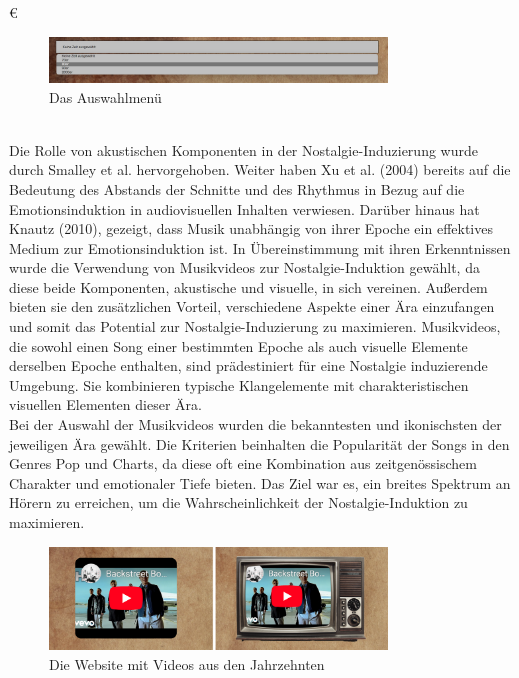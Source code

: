 €\documentclass[./dokumentation.tex]{subfiles}
\begin{document}
\begin{figure}[H]
    \centering
    \includegraphics[width=0.8\textwidth]{bilder/dropdown-scott.png}
    \caption{Das Auswahlmenü}
    \label{fig23:auswahl}
\end{figure}\\


Die Rolle von akustischen Komponenten in der Nostalgie-Induzierung wurde durch Smalley et al. hervorgehoben. Weiter haben Xu et al. (2004) bereits auf die Bedeutung des Abstands der Schnitte und des Rhythmus in Bezug auf die Emotionsinduktion in audiovisuellen Inhalten verwiesen. Darüber hinaus hat Knautz (2010), gezeigt, dass Musik unabhängig von ihrer Epoche ein effektives Medium zur Emotionsinduktion ist. In Übereinstimmung mit ihren Erkenntnissen wurde die Verwendung von Musikvideos zur Nostalgie-Induktion gewählt, da diese beide Komponenten, akustische und visuelle, in sich vereinen. Außerdem bieten sie den zusätzlichen Vorteil, verschiedene Aspekte einer Ära einzufangen und somit das Potential zur Nostalgie-Induzierung zu maximieren. Musikvideos, die sowohl einen Song einer bestimmten Epoche als auch visuelle Elemente derselben Epoche enthalten, sind prädestiniert für eine Nostalgie induzierende Umgebung. Sie kombinieren typische Klangelemente mit charakteristischen visuellen Elementen dieser Ära. \\

Bei der Auswahl der Musikvideos wurden die bekanntesten und ikonischsten der jeweiligen Ära gewählt. Die Kriterien beinhalten die Popularität der Songs in den Genres Pop und Charts, da diese oft eine Kombination aus zeitgenössischem Charakter und emotionaler Tiefe bieten. Das Ziel war es, ein breites Spektrum an Hörern zu erreichen, um die Wahrscheinlichkeit der Nostalgie-Induktion zu maximieren. \\

\begin{figure}[H]
    \centering
    \includegraphics[width=0.8\textwidth]{bilder/auswahl-videos.png}
    \caption{Die Website mit Videos aus den Jahrzehnten}
    \label{fig22:youtube}
\end{figure}\\
\end{document}
